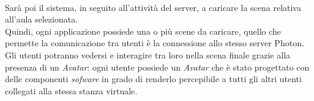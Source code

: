 \\Sarà poi il sistema, in seguito all'attività del server, a caricare la scena relativa all'aula selezionata.
\\Quindi, ogni applicazione possiede una o più scene da caricare, quello che permette la comunicazione tra utenti è la connessione allo stesso server Photon.
\\Gli utenti potranno vedersi e interagire tra loro nella scena finale grazie alla presenza di un \textit{Avatar}: ogni utente possiede un \textit{Avatar} che è stato progettato con delle componenti \textit{sofware} in grado di renderlo percepibile a tutti gli altri utenti collegati alla stessa stanza virtuale.